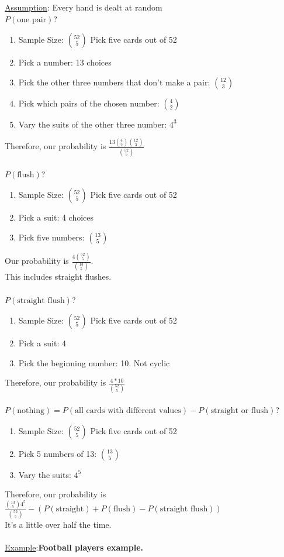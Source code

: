   \underline{Assumption}: Every hand is dealt at random\\
  $P(\text{one pair})$?
  \begin{enumerate}
    \item Sample Size: $\binom{52}{5}$ Pick five cards out of 52
    \item Pick a number: 13 choices
    \item Pick the other three numbers that don't make a pair: $\binom{12}{3}$
    \item Pick which pairs of the chosen number: $\binom{4}{2}$
    \item Vary the suits of the other three number: $4^3$
  \end{enumerate}
  Therefore, our probability is $\frac{13\binom{4}{2}\binom{12}{3}}{\binom{52}{5}}$\\\\
  $P(\text{flush})$?
  \begin{enumerate}
    \item Sample Size: $\binom{52}{5}$ Pick five cards out of 52
    \item Pick a suit: 4 choices
    \item Pick five numbers: $\binom{13}{5}$
  \end{enumerate}
  Our probability is $\frac{4\binom{52}{5}}{\binom{13}{5}}$.\\
  This includes straight flushes.\\\\
  $P(\text{straight flush})$?
  \begin{enumerate}
    \item Sample Size: $\binom{52}{5}$ Pick five cards out of 52
    \item Pick a suit: 4
    \item Pick the beginning number: 10. Not cyclic
  \end{enumerate}
  Therefore, our probability is $\frac{4*10}{\binom{52}{5}}$\\\\
  $P(\text{nothing}) = P(\text{all cards with different values}) - 
    P(\text{straight or flush})$?\\
  \begin{enumerate}
    \item Sample Size: $\binom{52}{5}$ Pick five cards out of 52
    \item Pick 5 numbers of 13: $\binom{13}{5}$
    \item Vary the suits: $4^5$
  \end{enumerate}
  Therefore, our probability is $\frac{\binom{13}{5}4^5}{\binom{52}{5}} - 
  (P(\text{straight}) + P(\text{flush}) - P(\text{straight flush}))$\\
  It's a little over half the time.\\\\
  \underline{Example}:{\bf Football players example.} 
  \vskip0.2cm 

